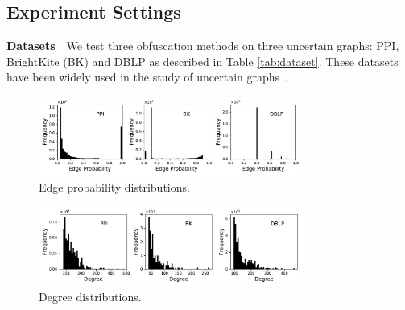 \subsection{Experiment Settings}




\textbf{Datasets}~~We test three obfuscation methods on three uncertain graphs: PPI, BrightKite (BK) and DBLP as described in Table \ref{tab:dataset}. These datasets have been widely used in the study of uncertain graphs~\cite{Zhao_Detecting_2014,Potamias_K_2010,Jin_Distance_2011}. 

\begin{figure}[!t]
	\begin{flushleft}
	\includegraphics[height=2.6cm]{expResult/probDistribution.pdf}
	\end{flushleft}
	\vspace{-10pt}
	\caption{Edge probability distributions.}
	\vspace{-10pt}
\end{figure}
\begin{figure}[!t]
	\begin{flushleft}
	\includegraphics[height=2.6cm]{expResult/degDistribution.pdf}
	\end{flushleft}
	\vspace{-10pt}
	\caption{Degree distributions.}
	\label{fig:degreeDist}
	\vspace{-10pt}
\end{figure}
